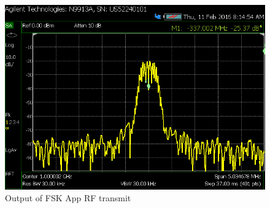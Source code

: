 \begin{figure}[ht]
\begin{minipage}{.45\textwidth}
			\centering\includegraphics[width=1.0\linewidth]{tx_spec_an}
			\caption{Output of FSK App RF transmit}
			\label{fig:tx_spec_an}
		\end{minipage}
	\end{figure}
